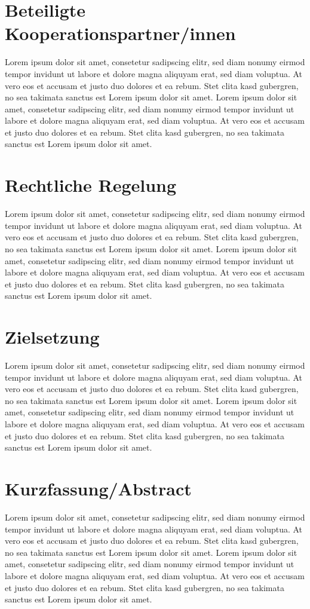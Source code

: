 \documentclass[11pt]{article}
\begin{document}
\section{Beteiligte Kooperationspartner/innen}
Lorem ipsum dolor sit amet, consetetur sadipscing elitr, sed diam nonumy eirmod tempor invidunt ut labore et dolore magna aliquyam erat, sed diam voluptua. At vero eos et accusam et justo duo dolores et ea rebum. Stet clita kasd gubergren, no sea takimata sanctus est Lorem ipsum dolor sit amet. Lorem ipsum dolor sit amet, consetetur sadipscing elitr, sed diam nonumy eirmod tempor invidunt ut labore et dolore magna aliquyam erat, sed diam voluptua. At vero eos et accusam et justo duo dolores et ea rebum. Stet clita kasd gubergren, no sea takimata sanctus est Lorem ipsum dolor sit amet.

\section{Rechtliche Regelung}
Lorem ipsum dolor sit amet, consetetur sadipscing elitr, sed diam nonumy eirmod tempor invidunt ut labore et dolore magna aliquyam erat, sed diam voluptua. At vero eos et accusam et justo duo dolores et ea rebum. Stet clita kasd gubergren, no sea takimata sanctus est Lorem ipsum dolor sit amet. Lorem ipsum dolor sit amet, consetetur sadipscing elitr, sed diam nonumy eirmod tempor invidunt ut labore et dolore magna aliquyam erat, sed diam voluptua. At vero eos et accusam et justo duo dolores et ea rebum. Stet clita kasd gubergren, no sea takimata sanctus est Lorem ipsum dolor sit amet.

\section{Zielsetzung}
Lorem ipsum dolor sit amet, consetetur sadipscing elitr, sed diam nonumy eirmod tempor invidunt ut labore et dolore magna aliquyam erat, sed diam voluptua. At vero eos et accusam et justo duo dolores et ea rebum. Stet clita kasd gubergren, no sea takimata sanctus est Lorem ipsum dolor sit amet. Lorem ipsum dolor sit amet, consetetur sadipscing elitr, sed diam nonumy eirmod tempor invidunt ut labore et dolore magna aliquyam erat, sed diam voluptua. At vero eos et accusam et justo duo dolores et ea rebum. Stet clita kasd gubergren, no sea takimata sanctus est Lorem ipsum dolor sit amet.

\section{Kurzfassung/Abstract}
Lorem ipsum dolor sit amet, consetetur sadipscing elitr, sed diam nonumy eirmod tempor invidunt ut labore et dolore magna aliquyam erat, sed diam voluptua. At vero eos et accusam et justo duo dolores et ea rebum. Stet clita kasd gubergren, no sea takimata sanctus est Lorem ipsum dolor sit amet. Lorem ipsum dolor sit amet, consetetur sadipscing elitr, sed diam nonumy eirmod tempor invidunt ut labore et dolore magna aliquyam erat, sed diam voluptua. At vero eos et accusam et justo duo dolores et ea rebum. Stet clita kasd gubergren, no sea takimata sanctus est Lorem ipsum dolor sit amet.
\end{document}
